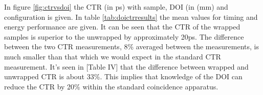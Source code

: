 In figure \ref{fig:ctrvsdoi} the CTR (in ps) with sample, DOI (in (mm) and configuration is given. In table \ref{tab:doictrresults} the mean values for timing and energy performance are given. It can be seen that the CTR of the wrapped samples is superior to the unwrapped by approximately 20ps. The difference between the two CTR measurements, 8\% averaged between the measurements, is much smaller than that which we would expect in the standard CTR measurement. It's seen in [Table IV]\cite{r_Paganoni_Pauwels_et_al__2011} that the difference between wrapped and unwrapped CTR is about 33\%. This implies that knowledge of the DOI can reduce the CTR by 20\% within the standard coincidence apparatus.